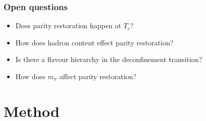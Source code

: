 \documentclass[11pt]{beamer}
\begin{document}
\begin{frame}
  \frametitle{Open questions}

  \begin{itemize}\setlength\itemsep{1em} 
    \item Does parity restoration happen at $T_c$?
    \item How does hadron content effect parity restoration?
    \item Is there a flavour hierarchy in the deconfinement transition?
    \item How does $m_{\pi}$ affect parity restoration?
  \end{itemize}
\end{frame}

\section{Method}
\end{document}
